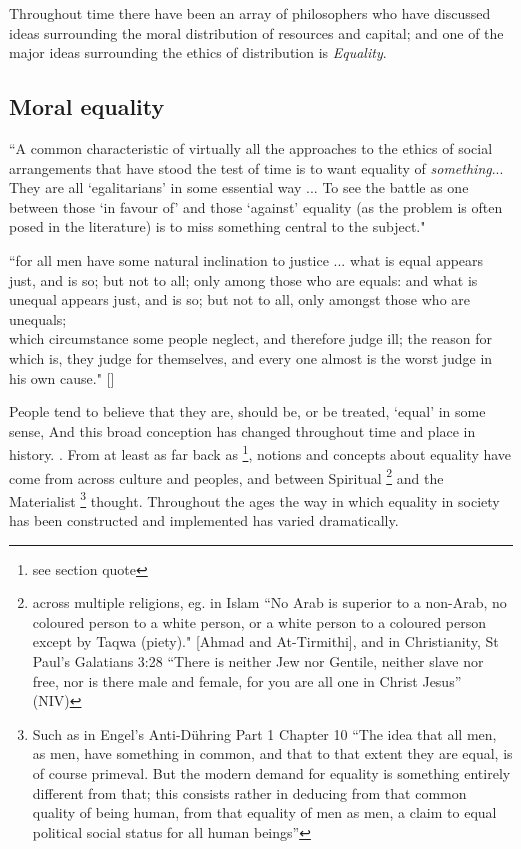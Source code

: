 Throughout time there have been an array of philosophers who have discussed ideas surrounding the moral distribution of resources and capital; and one of the major ideas surrounding the ethics of distribution is \textit{Equality}.

\subsection{Moral equality}

\begin{displayquote}
``A common characteristic of virtually all the approaches to the ethics of social arrangements that have stood the test of time is to want equality of \textit{something}... They are all `egalitarians' in some essential way ... To see the battle as one between those `in favour of' and those `against' equality (as the problem is often posed in the literature) is to miss something central to the subject."\cite[Chapter 1]{18084} 
\end{displayquote}

\begin{displayquote}
``for all men have some natural inclination to justice ... what is equal appears just, and is so; but not to all; only among those who are equals: and what is unequal appears just, and is so; but not to all, only amongst those who are unequals;\\
which circumstance some people neglect, and therefore judge ill; the reason for which is, they judge for themselves, and every one almost is the worst judge in his own cause." [\citeauthor[Politics, chapter III.9]{AristotleGutenberg}]
\end{displayquote}


People tend to believe that they are, should be, or be treated, `equal' in some sense, 
And this broad conception has changed throughout time and place in history. \citep{themeaningofequalitycapaldi}.
From at least as far back as \citeauthor{AristotleGutenberg}\footnote{see section quote}, notions and concepts about equality have come from across culture and peoples, and between Spiritual \footnote{across multiple religions, eg. in Islam ``No Arab is superior to a non-Arab, no coloured person to a  white person, or a white person to a coloured person except by Taqwa (piety)." [Ahmad and At-Tirmithi], and in Christianity, St Paul's Galatians 3:28 ``There is neither Jew nor Gentile, neither slave nor free, nor is there male and female, for you are all one in Christ Jesus'' (NIV) } and the Materialist \footnote{Such as in Engel's Anti-D\"{u}hring Part 1 Chapter 10 ``The idea that all men, as men, have something in common, and that to that extent they are equal, is of course primeval. But the modern demand for equality is something entirely different from that; this consists rather in deducing from that common quality of being human, from that equality of men as men, a claim to equal political social status for all human beings''} thought.
Throughout the ages the way in which equality in society has been constructed and implemented has varied dramatically.%

